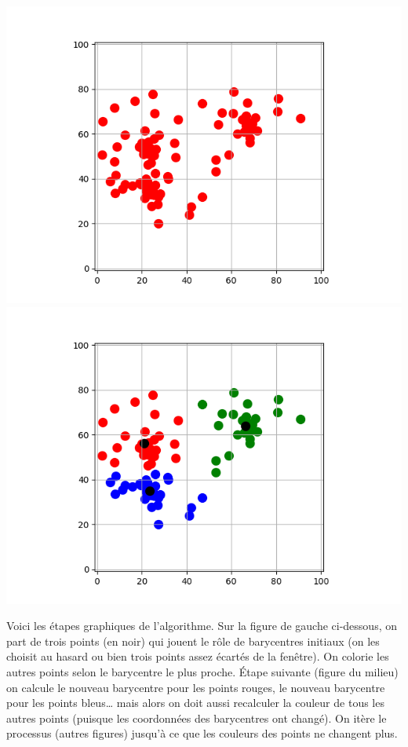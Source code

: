 \documentclass[11pt,class=report,crop=false]{standalone}
\begin{document}
\begin{activite}[Barycentres]
\begin{enumerate}
	\begin{center}
		\includegraphics[scale=\myscale,scale=0.5]{ecran_barycentres_exemple_01}\quad
		\includegraphics[scale=\myscale,scale=0.5]{ecran_barycentres_exemple_10}
	\end{center}	
	
	Voici les étapes graphiques de l'algorithme. Sur la figure de gauche ci-dessous, on part de trois points (en noir) qui jouent le rôle de barycentres initiaux (on les choisit au hasard ou bien trois points assez écartés de la fenêtre).
	On colorie les autres points selon le barycentre le plus proche. \'Etape suivante (figure du milieu) on calcule le nouveau barycentre pour les points rouges, le nouveau barycentre  pour les points bleus\ldots{} mais alors on doit aussi recalculer la couleur de tous les autres points (puisque les coordonnées des barycentres ont changé). On itère le processus (autres figures) jusqu'à ce que les couleurs des points ne changent plus.
	 


\end{enumerate}
\end{activite}
\end{document}
